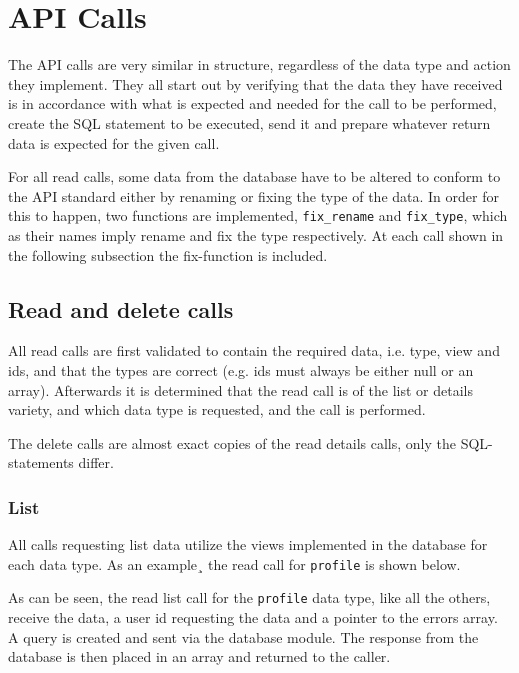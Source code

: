 \section{API Calls}
The API calls are very similar in structure, regardless of the data type and action they implement. They all start out by verifying that the data they have received is in accordance with what is expected and needed for the call to be performed, create the SQL statement to be executed, send it and prepare whatever return data is expected for the given call. 

For all read calls, some data from the database have to be altered to conform to the API standard either by renaming or fixing the type of the data. In order for this to happen, two functions are implemented,  \lstinline|fix_rename| and  \lstinline|fix_type|, which as their names imply rename and fix the type respectively. At each call shown in the following subsection the fix-function is included.  

\subsection{Read and delete calls}
All read calls are first validated to contain the required data, i.e. type, view and ids, and that the types are correct (e.g. ids must always be either null or an array). Afterwards it is determined that the read call is of the list or details variety, and which data type is requested, and the call is performed.

The delete calls are almost exact copies of the read details calls, only the SQL-statements differ.

\subsubsection{List}
All calls requesting list data utilize the views implemented in the database for each data type. As an example¸ the read call for \lstinline|profile| is shown below.



As can be seen, the read list call for the \lstinline|profile| data type, like all the others, receive the data, a user id requesting the data and a pointer to the errors array. A query is created and sent via the database module. The response from the database is then placed in an array and returned to the caller. 

